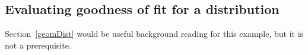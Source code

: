 \subsection{Evaluating goodness of fit for a distribution}

Section~\ref{geomDist} would be useful background reading for this example, but it is not a prerequisite.


\newcommand{\spyears}{10}
\newcommand{\spdays}{1362}
\newcommand{\spdaysA}{717}
\newcommand{\spdaysB}{369}
\newcommand{\spdaysC}{155}
\newcommand{\spdaysD}{69}
\newcommand{\spdaysE}{28}
\newcommand{\spdaysF}{14}
\newcommand{\spdaysG}{10}
\newcommand{\spdaysEA}{743}
\newcommand{\spdaysEB}{338}
\newcommand{\spdaysEC}{154}
\newcommand{\spdaysED}{70}
\newcommand{\spdaysEE}{32}
\newcommand{\spdaysEF}{14}
\newcommand{\spdaysEG}{12}
\newcommand{\spdaysEProp}{0.1128}
\newcommand{\spdaysEPerc}{11.28\%}
\newcommand{\spUpProp}{0.545}
\newcommand{\spUpPerc}{54.5\%}
\newcommand{\spDownProp}{0.455}
\newcommand{\spDownPerc}{45.5\%}
\newcommand{\spdaysXSq}{4.61}
\newcommand{\spdaysN}{7}
\newcommand{\spdaysDF}{6}
\newcommand{\spdaysPvalue}{0.5951}

